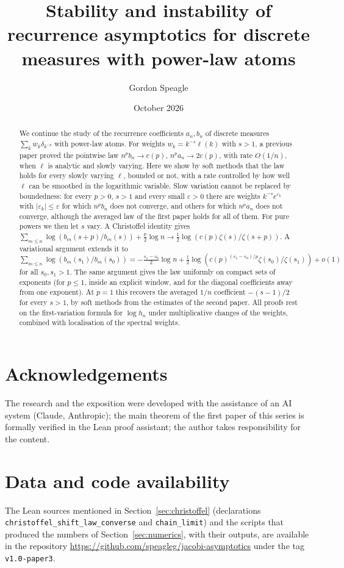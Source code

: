 \documentclass[11pt]{amsart}
\title[Stability and instability of recurrence asymptotics]{Stability and instability of recurrence asymptotics for
discrete measures with power-law atoms}
\author{Gordon Speagle}
\date{October 2026}
\theoremstyle{definition}
\theoremstyle{remark}
\numberwithin{equation}{section}
\begin{document}
\begin{abstract}
We continue the study of the recurrence coefficients $a_n,b_n$ of discrete measures $\sum_kw_k\delta_{k^{-p}}$ with
power-law atoms. For weights $w_k=k^{-s}\ell(k)$ with $s>1$, a previous paper proved the pointwise law
$n^pb_n\to c(p)$, $n^pa_n\to2c(p)$, with rate $O(1/n)$, when $\ell$ is analytic and slowly varying. Here we show by
soft methods that the law holds for every slowly varying $\ell$, bounded or not, with a rate controlled by how well
$\ell$ can be smoothed in the logarithmic variable. Slow variation cannot be replaced by boundedness: for every
$p>0$, $s>1$ and every small $\varepsilon>0$ there are weights $k^{-s}e^{\varepsilon_k}$ with
$|\varepsilon_k|\le\varepsilon$ for which $n^pb_n$ does not converge, and others for which $n^pa_n$ does not
converge, although the averaged law of the first paper holds for all of them. For pure powers we then let $s$ vary.
A Christoffel identity gives
$\sum_{m\le n}\log(b_m(s+p)/b_m(s))+\frac p2\log n\to\frac12\log(c(p)\zeta(s)/\zeta(s+p))$. A variational argument
extends it to
$\sum_{m\le n}\log(b_m(s_1)/b_m(s_0))=-\frac{s_1-s_0}{2}\log n+\frac12\log(c(p)^{(s_1-s_0)/p}\zeta(s_0)/\zeta(s_1))
+o(1)$ for all $s_0,s_1>1$. The same argument gives the law uniformly on compact sets of exponents (for $p\le1$, inside an
explicit window, and for the diagonal coefficients away from one exponent). At $p=1$ this recovers the averaged $1/n$ coefficient $-(s-1)/2$ for every $s>1$, by soft methods from
the estimates of the second paper. All proofs rest on the first-variation formula for $\log h_n$
under multiplicative changes of the weights, combined with localisation of the spectral weights.
\end{abstract}

\maketitle










\section*{Acknowledgements}
The research and the exposition were developed with the assistance of an AI system (Claude, Anthropic); the main
theorem of the first paper of this series \cite{PaperI} is formally verified in the Lean proof assistant; the author
takes responsibility for the content.

\section*{Data and code availability}
{\raggedright The Lean sources mentioned in Section~\ref{sec:christoffel} (declarations
\texttt{christoffel\_shift\_law\_converse} and \texttt{chain\_limit}) and the scripts that produced the numbers of
Section~\ref{sec:numerics}, with their outputs, are available in the repository
\url{https://github.com/speagleg/jacobi-asymptotics} under the tag \texttt{v1.0-paper3}.\par}



\end{document}
